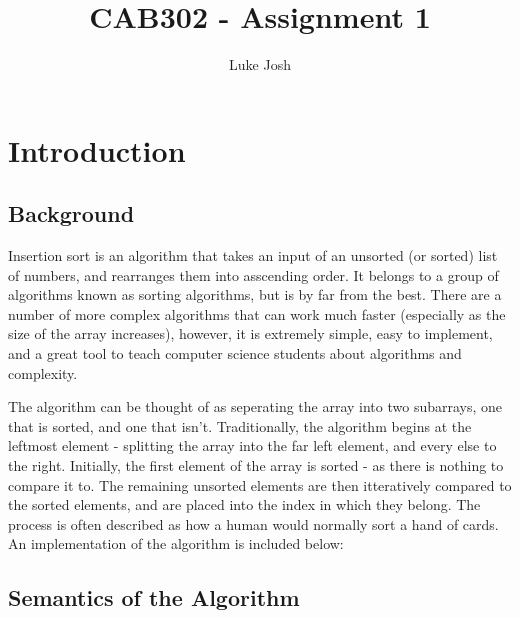 \documentclass{article}
\title{CAB302 - Assignment 1}
\author{Luke Josh}
\begin{document}

\maketitle
\tableofcontents
\pagebreak

\section{Introduction}
    \subsection{Background}
        Insertion sort is an algorithm that takes an input of an unsorted (or sorted) list of numbers, and rearranges
        them into asscending order. It belongs to a group of algorithms known as sorting algorithms, but is by far from the best.
        There are a number of more complex algorithms that can work much faster (especially as the size of the array increases),
        however, it is extremely simple, easy to implement, and a great tool to teach computer science students about algorithms and complexity.

        The algorithm can be thought of as seperating the array into two subarrays, one that is sorted, and one that isn't. Traditionally, the algorithm begins at the
        leftmost element - splitting the array into the far left element, and every else to the right. Initially, the first element of the array is sorted -
        as there is nothing to compare it to. The remaining unsorted elements are then itteratively compared
        to the sorted elements, and are placed into the index in which they belong. The process is often described as how a human would normally sort a hand of cards.
        An implementation of the algorithm is included below:\linebreak

    \subsection{Semantics of the Algorithm}
        \begin{algorithmic}
                    \EndWhile
                \EndFor
            \EndFunction
        \end{algorithmic}
\end{document}
